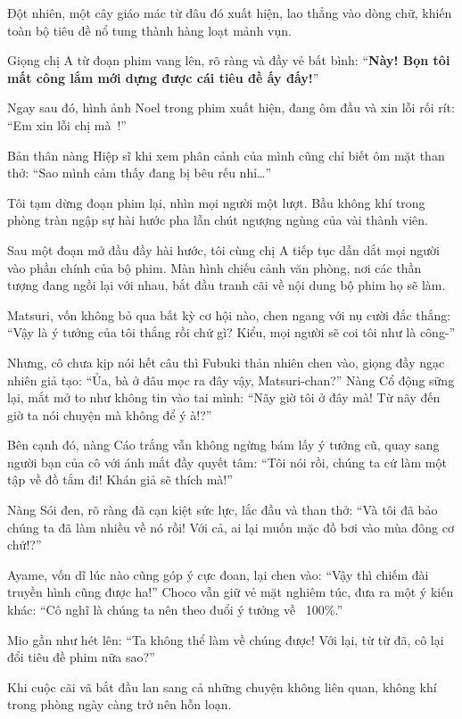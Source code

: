 \documentclass[../main.tex]{subfiles}
\begin{document}
Đột nhiên, một cây giáo mác từ đâu đó xuất hiện, lao thẳng vào dòng chữ, khiến toàn bộ tiêu đề nổ tung thành hàng loạt mảnh vụn.

Giọng chị A từ đoạn phim vang lên, rõ ràng và đầy vẻ bất bình: ``\textbf{Này! Bọn tôi mất công lắm mới dựng được cái tiêu đề ấy đấy!}''

Ngay sau đó, hình ảnh Noel trong phim xuất hiện, đang ôm đầu và xin lỗi rối rít: ``Em xin lỗi chị mà~!''

Bản thân nàng Hiệp sĩ khi xem phân cảnh của mình cũng chỉ biết ôm mặt than thở: ``Sao mình cảm thấy đang bị bêu rếu nhỉ\dots''

Tôi tạm dừng đoạn phim lại, nhìn mọi người một lượt. Bầu không khí trong phòng tràn ngập sự hài hước pha lẫn chút ngượng ngùng của vài thành viên.

Sau một đoạn mở đầu đầy hài hước, tôi cùng chị A tiếp tục dẫn dắt mọi người vào phần chính của bộ phim. Màn hình chiếu cảnh văn phòng, nơi các thần tượng đang ngồi lại với nhau, bắt đầu tranh cãi về nội dung bộ phim họ sẽ làm.

\il

Matsuri, vốn không bỏ qua bất kỳ cơ hội nào, chen ngang với nụ cười đắc thắng: ``Vậy là ý tưởng của tôi thắng rồi chứ gì? Kiểu, mọi người sẽ coi tôi như là công-''

Nhưng, cô chưa kịp nói hết câu thì Fubuki thản nhiên chen vào, giọng đầy ngạc nhiên giả tạo: ``Ủa, bà ở đâu mọc ra đây vậy, Matsuri-chan?'' Nàng Cổ động sững lại, mắt mở to như không tin vào tai mình: ``Nãy giờ tôi ở đây mà! Từ nãy đến giờ ta nói chuyện mà không để ý à!?''

Bên cạnh đó, nàng Cáo trắng vẫn không ngừng bám lấy ý tưởng cũ, quay sang người bạn của cô với ánh mắt đầy quyết tâm: ``Tôi nói rồi, chúng ta cứ làm một tập về đồ tắm đi! Khán giả sẽ thích mà!''

Nàng Sói đen, rõ ràng đã cạn kiệt sức lực, lắc đầu và than thở: ``Và tôi đã bảo chúng ta đã làm nhiều về nó rồi! Với cả, ai lại muốn mặc đồ bơi vào mùa đông cơ chứ!?''

Ayame, vốn dĩ lúc nào cũng góp ý cực đoan, lại chen vào: ``Vậy thì chiếm đài truyền hình cũng được ha!'' Choco vẫn giữ vẻ mặt nghiêm túc, đưa ra một ý kiến khác: ``Cô nghĩ là chúng ta nên theo đuổi ý tưởng về \hll\ 100\%.''

Mio gần như hét lên: ``Ta không thể làm về chúng được! Với lại, từ từ đã, cô lại đổi tiêu đề phim nữa sao?''

Khi cuộc cãi vã bắt đầu lan sang cả những chuyện không liên quan, không khí trong phòng ngày càng trở nên hỗn loạn.
\end{document}
